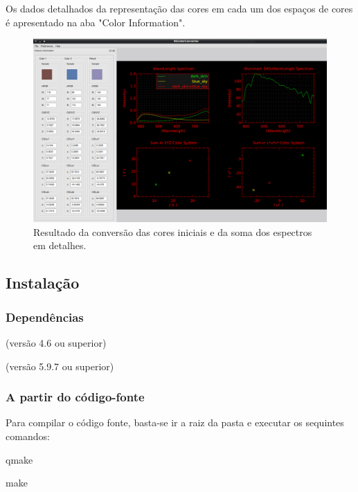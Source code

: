 \documentclass[a4paper,10pt]{report}
\begin{document}
\par
Os dados detalhados da representação das cores em cada um dos espaços de cores
é apresentado na aba "Color Information".

\begin{figure}[!htb]
     \centering
     \includegraphics[scale=0.6]{img/screenshot_RGColorConverter_details.png}
     \caption{Resultado da conversão das cores iniciais e da soma dos
espectros em detalhes.}
     \label{fig:screenshot_details}
\end{figure}

\subsection{Instalação}

\subsubsection{Dependências}
\begin{list}{}{}
\item {} (versão 4.6 ou superior)
\item {} (versão 5.9.7
ou superior)
\end{list}

\subsubsection{A partir do código-fonte}
\par
Para compilar o código fonte, basta-se ir a raiz da pasta e executar os
sequintes comandos:

\begin{list}{}{}
\item qmake
\item make
\end{list}
\end{document}
